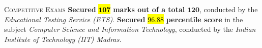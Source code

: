 \begin{rubric}{\textsc{Competitive Exams}}
%
\entry*[TOEFL~$- ~2021$] \textbf{Secured} \hl{$\boldsymbol{107}$} \textbf{marks out of a total} $\boldsymbol{120}$, conducted by the \emph{Educational Testing Service (ETS).}
%
 \textbf{Secured} \hl{$\boldsymbol{96.88}$} \textbf{percentile score} in the subject \emph{Computer Science and Information Technology}, conducted by the \emph{Indian Institute of Technology (IIT) Madras.}
%
\end{rubric}